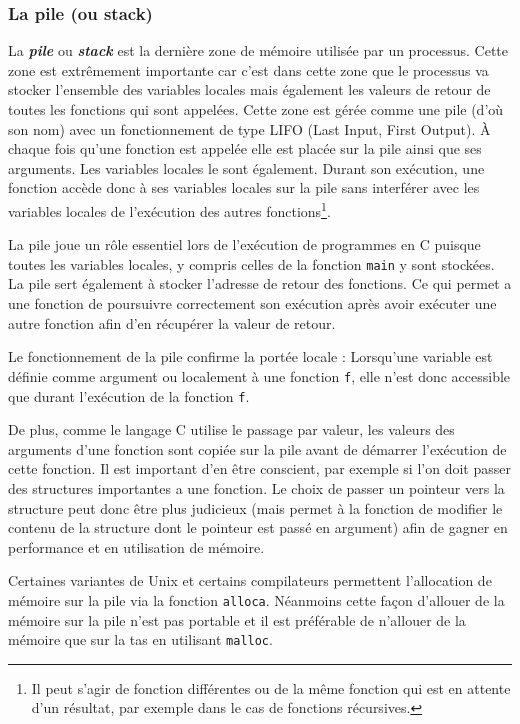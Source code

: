 \subsubsection{La pile (ou stack)}
La \textbf{\textit{pile}} ou \textbf{\textit{stack}} est la dernière zone de mémoire utilisée par un processus.
Cette zone est extrêmement importante car c'est dans cette zone que le processus va stocker l'ensemble des variables locales mais également les valeurs de retour de toutes les fonctions qui sont appelées.
Cette zone est gérée comme une pile (d'où son nom) avec un fonctionnement de type LIFO (Last Input, First Output).
À chaque fois qu'une fonction est appelée elle est placée sur la pile ainsi que ses arguments.
Les variables locales le sont également.
Durant son exécution, une fonction accède donc à ses variables locales sur la pile sans interférer avec les variables locales de l'exécution des autres fonctions\footnote{Il peut s'agir de fonction différentes ou de la même fonction qui est en attente d'un résultat, par exemple dans le cas de fonctions récursives.}.

La pile joue un rôle essentiel lors de l'exécution de programmes en C puisque toutes les variables locales, y compris celles de la fonction \texttt{main} y sont stockées.
La pile sert également à stocker l'adresse de retour des fonctions.
Ce qui permet a une fonction de poursuivre correctement son exécution après avoir exécuter une autre fonction afin d'en récupérer la valeur de retour.

Le fonctionnement de la pile confirme la portée locale : Lorsqu'une variable est définie comme argument ou localement à une fonction \texttt{f}, elle n'est donc accessible que durant l'exécution de la fonction \texttt{f}.

De plus, comme le langage C utilise le passage par valeur, les valeurs des arguments d'une fonction sont copiée sur la pile avant de démarrer l'exécution de cette fonction.
Il est important d'en être conscient, par exemple si l'on doit passer des structures importantes a une fonction.
Le choix de passer un pointeur vers la structure peut donc être plus judicieux (mais permet à la fonction de modifier le contenu de la structure dont le pointeur est passé en argument) afin de gagner en performance et en utilisation de mémoire.


Certaines variantes de Unix et certains compilateurs permettent l'allocation de mémoire sur la pile via la fonction \texttt{alloca}.
Néanmoins cette façon d'allouer de la mémoire sur la pile n'est pas portable et il est préférable de n'allouer de la mémoire que sur la tas en utilisant \texttt{malloc}.

